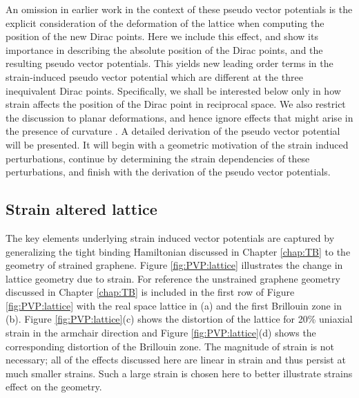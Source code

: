 An omission in earlier work in the context of these pseudo vector potentials is the explicit consideration of the deformation of the lattice when computing the position of the new Dirac points.
Here we include this effect, and show its importance in describing the absolute position of the Dirac points, and the resulting pseudo vector potentials.
This yields new leading order terms in the strain-induced pseudo vector potential which are different at the three inequivalent Dirac points.
Specifically, we shall be interested below only in how strain affects the position of the Dirac point in reciprocal space.
We also restrict the discussion to planar deformations, and hence ignore effects that might arise in the presence of curvature \cite{CastroNeto2009,Vozmediano2010}.
A detailed derivation of the pseudo vector potential will be presented.
It will begin with a geometric motivation of the strain induced perturbations, continue by determining the strain dependencies of these perturbations, and finish with the derivation of the pseudo vector potentials.

\subsection{Strain altered lattice}
The key elements underlying strain induced vector potentials are captured by generalizing the tight binding Hamiltonian discussed in Chapter \ref{chap:TB} to the geometry of strained graphene.
Figure \ref{fig:PVP:lattice} illustrates the change in lattice geometry due to strain.
For reference the unstrained graphene geometry discussed in Chapter \ref{chap:TB} is included in the first row of Figure \ref{fig:PVP:lattice} with the real space lattice in (a) and the first Brillouin zone in (b).
Figure \ref{fig:PVP:lattice}(c) shows the distortion of the lattice for 20\% uniaxial strain in the armchair direction and Figure \ref{fig:PVP:lattice}(d) shows the corresponding distortion of the Brillouin zone.
The magnitude of strain is not necessary; all of the effects discussed here are linear in strain and thus persist at much smaller strains.
Such a large strain is chosen here to better illustrate strains effect on the geometry.

